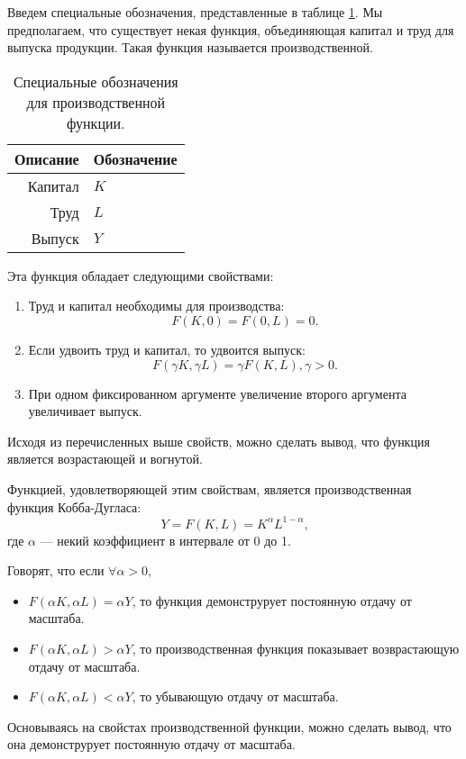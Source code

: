 Введем специальные обозначения, представленные в таблице \ref{tab:prod_func}.
Мы предполагаем, что существует некая функция, объединяющая капитал и труд для выпуска продукции.
Такая функция называется производственной.
\begin{table}[ht]
	\centering
	\caption{Специальные обозначения для производственной функции.}
	\begin{tabular}{|r|l|}
		\hline
		Описание & Обозначение \\ \hline
		Капитал  &      $K$    \\
		Труд     &      $L$    \\
		Выпуск   &      $Y$    \\ \hline
		\end{tabular}%
	\label{tab:prod_func}
\end{table}

Эта функция обладает следующими свойствами:
\begin{enumerate}
	\item Труд и капитал необходимы для производства:
	\[
		F(K, 0) = F(0, L) = 0\text{.}
	\]
	\item Если удвоить труд и капитал, то удвоится выпуск:
	\[
		F(\gamma K, \gamma L) = \gamma F(K, L), \gamma > 0\text{.}
	\]
	\item При одном фиксированном аргументе увеличение второго аргумента увеличивает выпуск.
\end{enumerate}

Исходя из перечисленных выше свойств, можно сделать вывод, что функция является возрастающей и вогнутой.

Функцией, удовлетворяющей этим свойствам, является производственная функция Кобба-Дугласа:
\begin{equation}
	Y = F(K, L) = K^{\alpha}L^{1-\alpha}\text{,}
\label{F:Cob_Duglas}
\end{equation}
где $\alpha$ --- некий коэффициент в интервале от 0 до 1.

Говорят, что если $\forall \alpha>0$,
\begin{itemize}
\item $F(\alpha K, \alpha L) = \alpha Y$, то функция демонструрует постоянную отдачу от масштаба.
\item $F(\alpha K, \alpha L) > \alpha Y$, то производственная функция показывает возврастающую отдачу от масштаба.
\item $F(\alpha K, \alpha L) < \alpha Y$, то убывающую отдачу от масштаба.
\end{itemize}
Основываясь на свойстах производственной функции, можно сделать вывод, что она демонструрует постоянную отдачу от масштаба.


